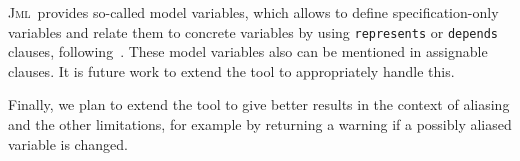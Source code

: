 \documentclass[a4paper]{llncs}
\newcommand{\jml}{\textsc{Jml}}
\begin{document}
\jml\ provides so-called model variables, which allows to define
specification-only variables and relate them to concrete variables by
using \texttt{represents} or \texttt{depends} clauses,
following~\cite{Leino98}. These model variables also can be mentioned
in assignable clauses. It is future work to extend the tool to
appropriately handle this.


Finally, we plan to extend the tool to give better results in the
context of aliasing and the other limitations, for example by
returning a warning if a possibly aliased variable is changed.



\end{document}

